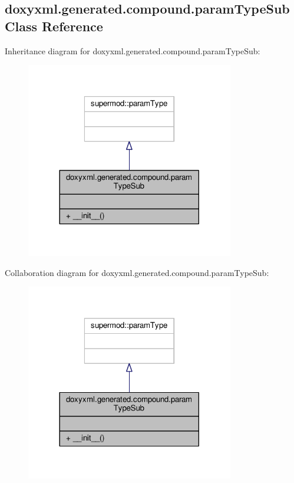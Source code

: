\subsection{doxyxml.\+generated.\+compound.\+param\+Type\+Sub Class Reference}
\label{classdoxyxml_1_1generated_1_1compound_1_1paramTypeSub}


Inheritance diagram for doxyxml.\+generated.\+compound.\+param\+Type\+Sub\+:
\nopagebreak
\begin{figure}[H]
\begin{center}
\leavevmode
\includegraphics[width=257pt]{d8/d56/classdoxyxml_1_1generated_1_1compound_1_1paramTypeSub__inherit__graph}
\end{center}
\end{figure}


Collaboration diagram for doxyxml.\+generated.\+compound.\+param\+Type\+Sub\+:
\nopagebreak
\begin{figure}[H]
\begin{center}
\leavevmode
\includegraphics[width=257pt]{de/dd8/classdoxyxml_1_1generated_1_1compound_1_1paramTypeSub__coll__graph}
\end{center}
\end{figure}
